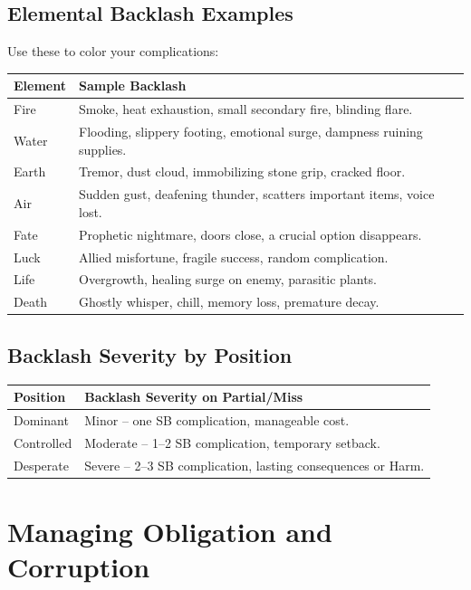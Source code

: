 \subsection*{Elemental Backlash Examples}
\label{subsec:elemental-backlash}
Use these to color your complications:

\begin{center}
\begin{tabular}{ll}
\toprule
\textbf{Element} & \textbf{Sample Backlash} \\
\midrule
Fire & Smoke, heat exhaustion, small secondary fire, blinding flare. \\
Water & Flooding, slippery footing, emotional surge, dampness ruining supplies. \\
Earth & Tremor, dust cloud, immobilizing stone grip, cracked floor. \\
Air & Sudden gust, deafening thunder, scatters important items, voice lost. \\
Fate & Prophetic nightmare, doors close, a crucial option disappears. \\
Luck & Allied misfortune, fragile success, random complication. \\
Life & Overgrowth, healing surge on enemy, parasitic plants. \\
Death & Ghostly whisper, chill, memory loss, premature decay. \\
\bottomrule
\end{tabular}
\end{center}

\subsection*{Backlash Severity by Position}
\label{subsec:backlash-severity}
\begin{center}
\begin{tabular}{ll}
\toprule
\textbf{Position} & \textbf{Backlash Severity on Partial/Miss} \\
\midrule
Dominant & Minor -- one SB complication, manageable cost. \\
Controlled & Moderate -- 1--2 SB complication, temporary setback. \\
Desperate & Severe -- 2--3 SB complication, lasting consequences or Harm. \\
\bottomrule
\end{tabular}
\end{center}

\section{Managing Obligation and Corruption}
\label{sec:obligation-corruption-gm}

